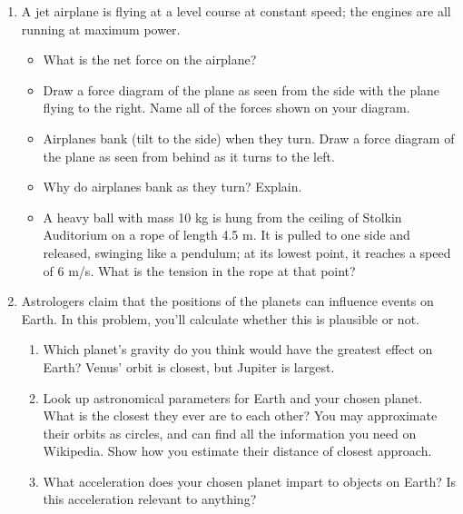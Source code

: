 \documentclass[12pt]{article}
\begin{document}
\Large
\centerline{}
\normalsize
\centerline{}

\begin{enumerate}


  \item A jet airplane is flying at a level course at constant speed; the engines are all running at maximum power. 

\begin{itemize}

\item What is the net force on the airplane?

\item Draw a force diagram of the plane as seen from the side with the plane
flying to the right. Name all of the forces shown on your diagram. 

\item Airplanes bank (tilt to the side) when they turn. Draw a force diagram of the 
plane as seen from behind as it turns to the left. 

\item Why do airplanes bank as they turn? Explain.

\item A heavy ball with mass 10 kg is hung from the ceiling of Stolkin Auditorium
on a rope of length 4.5 m. It is pulled to one side and released, swinging like
a pendulum; at its lowest point, it reaches a speed of 6 m/s. What is the tension
in the rope at that point?
\end{itemize}

  \item Astrologers claim that the positions of the planets can influence events on Earth. In this problem,
you'll calculate whether this is plausible or not.

\begin{enumerate}
\item Which planet's gravity do you think would have the greatest effect on Earth? Venus' orbit is closest,
but Jupiter is largest.
\item Look up astronomical parameters for Earth and your chosen planet. What is the closest they ever
are to each other? You may approximate their orbits as circles, and can find all the information you need
on Wikipedia. Show how you estimate their distance of closest approach.
\item What acceleration does your chosen planet impart to objects on Earth? Is this acceleration relevant 
to anything?
\end{enumerate}


\end{enumerate}
\end{document}
